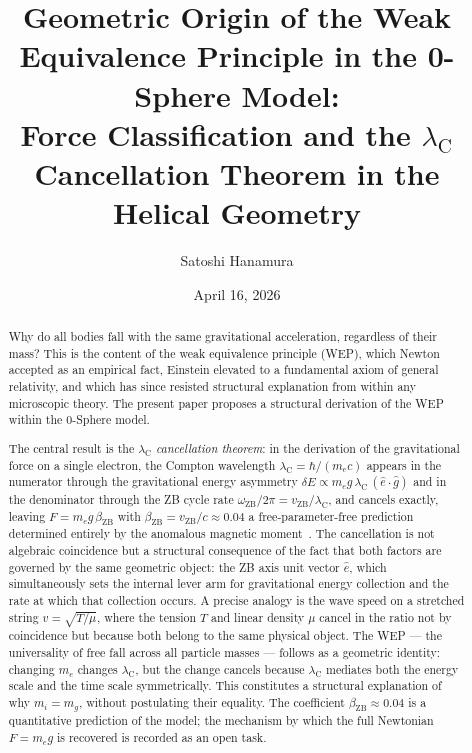 \documentclass[%
 reprint, amsmath,amssymb, aps, prb, ]{revtex4-2}
\numberwithin{equation}{section}
\newcommand{\omZB}{\omega_{\text{ZB}}}
\newcommand{\lambdaC}{\lambda_{\mathrm{C}}}
\newcommand{\betaZB}{\beta_{\mathrm{ZB}}}
\newcommand{\vZB}{v_{\mathrm{ZB}}}
\begin{document}

\title{Geometric Origin of the Weak Equivalence Principle in the 0-Sphere Model:\\
Force Classification and the $\lambdaC$ Cancellation Theorem in the Helical Geometry}

\author{Satoshi Hanamura}
\date{April 16, 2026}

\begin{abstract}
Why do all bodies fall with the same gravitational acceleration, regardless of their mass?
This is the content of the weak equivalence principle (WEP), which Newton accepted as an empirical fact, Einstein elevated to a fundamental axiom of general relativity, and which has since resisted structural explanation from within any microscopic theory.
The present paper proposes a structural derivation of the WEP within the 0-Sphere model.

The central result is the \emph{$\lambdaC$ cancellation theorem}: in the derivation of the gravitational force on a single electron, the Compton wavelength $\lambdaC = \hbar/(m_e c)$ appears in the numerator through the gravitational energy asymmetry $\delta E \propto m_e g\,\lambdaC\,(\hat{e}\cdot\hat{g})$ and in the denominator through the ZB cycle rate $\omZB/2\pi = \vZB/\lambdaC$, and cancels exactly, leaving $F = m_e g\,\betaZB$ with $\betaZB = \vZB/c \approx 0.04$ a free-parameter-free prediction determined entirely by the anomalous magnetic moment~\cite{hanamura10}.
The cancellation is not algebraic coincidence but a structural consequence of the fact that both factors are governed by the same geometric object: the ZB axis unit vector $\hat{e}$, which simultaneously sets the internal lever arm for gravitational energy collection and the rate at which that collection occurs.
A precise analogy is the wave speed on a stretched string $v = \sqrt{T/\mu}$, where the tension $T$ and linear density $\mu$ cancel in the ratio not by coincidence but because both belong to the same physical object.
The WEP --- the universality of free fall across all particle masses --- follows as a geometric identity: changing $m_e$ changes $\lambdaC$, but the change cancels because $\lambdaC$ mediates both the energy scale and the time scale symmetrically.
This constitutes a structural explanation of why $m_i = m_g$, without postulating their equality.
The coefficient $\betaZB \approx 0.04$ is a quantitative prediction of the model; the mechanism by which the full Newtonian $F = m_e g$ is recovered is recorded as an open task.


\end{abstract}
\end{document}
